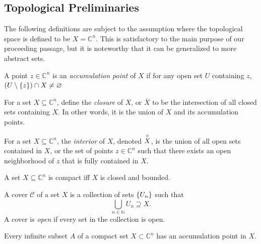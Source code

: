 \subsection{Topological Preliminaries}
The following definitions are subject to the assumption where the topological space is defined to be \(X=\mathbb{C}^n\). This is satisfactory to the main purpose of our proceeding passage, but it is noteworthy that it can be generalized to more abstract sets.
\begin{definition}\label{def:accumulationpoint}
    A point \(z\in\mathbb{C}^n\) is an \textit{accumulation point} of \(X\) if for any open set \(U\) containing \(z\), \((U\setminus\cbraces{z})\cap X\neq\varnothing\)
\end{definition}
\begin{definition}[Closure]\label{def:closure}
    For a set \(X\subseteq\mathbb{C}^n\), define the \textit{closure} of \(X\), or \(\overline{X}\) to be the intersection of all closed sets containing \(X\). In other words, it is the union of \(X\) and its accumulation points.
\end{definition}
\begin{definition}[Interior]\label{def:interior}
    For a set \(X\subseteq\mathbb{C}^n\), the \textit{interior} of \(X\), denoted \(\overset{\circ}{X}\), is the union of all open sets contained in \(X\), or the set of points \(z\in\mathbb{C}^n\) such that there exists an open neighborhood of \(z\) that is fully contained in \(X\).
\end{definition}
\begin{definition}\label{def:compactsets}
    A set \(X\subseteq\mathbb{C}^n\) is compact iff \(X\) is closed and bounded.
\end{definition}
\begin{definition}
    A cover \(\mathcal{C}\) of a set \(X\) is a collection of sets \(\cbraces{U_n}\) such that \[\bigcup_{n\in\mathbb{N}}U_n\supseteq X.\] A cover is \textit{open} if every set in the collection is open.
\end{definition}
\begin{theorem}\label{thm:bolzanoweierstrass}
    Every infinite subset \(A\) of a compact set \(X\subset\mathbb{C}^n\) has an accumulation point in \(X\).
\end{theorem}
